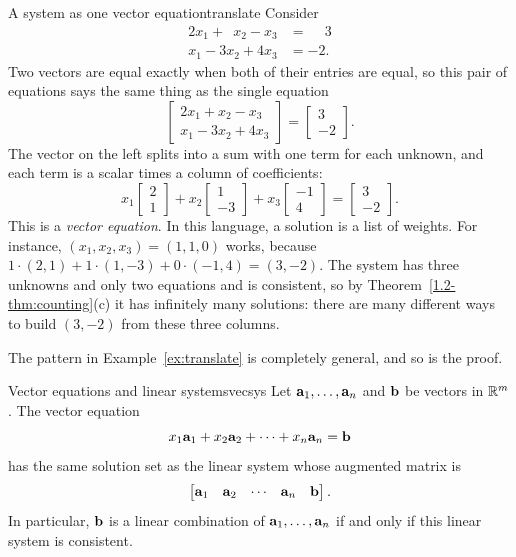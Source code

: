 \documentclass[11pt]{article}
\begin{document}
\begin{exmp}{A system as one vector equation}{translate}
Consider
\[
\begin{aligned}
2x_1+\phantom{3}x_2-x_3&=\phantom{-}3\\
x_1-3x_2+4x_3&=-2.
\end{aligned}
\]
Two vectors are equal exactly when both of their entries are equal, so this pair of equations says the same thing as the
single equation
\[
\begin{bmatrix}2x_1+x_2-x_3\\ x_1-3x_2+4x_3\end{bmatrix}=\begin{bmatrix}3\\-2\end{bmatrix}.
\]
The vector on the left splits into a sum with one term for each unknown, and each term is a scalar times a column of
coefficients:
\[
x_1\begin{bmatrix}2\\1\end{bmatrix}+x_2\begin{bmatrix}1\\-3\end{bmatrix}+x_3\begin{bmatrix}-1\\4\end{bmatrix}
=\begin{bmatrix}3\\-2\end{bmatrix}.
\]
This is a \emph{vector equation}. In this language, a solution is a list of weights. For instance,
$(x_1,x_2,x_3)=(1,1,0)$ works, because
$1\cdot(2,1)+1\cdot(1,-3)+0\cdot(-1,4)=(3,-2)$. The system has three unknowns and only two equations and is consistent,
so by Theorem~\ref{1.2-thm:counting}(c) it has infinitely many solutions: there are many different ways to build
$(3,-2)$ from these three columns.
\end{exmp}

The pattern in Example~\ref{ex:translate} is completely general, and so is the proof.

\begin{thm}{Vector equations and linear systems}{vecsys}
Let $\mathbf{a}_1,\dots,\mathbf{a}_n$ and $\mathbf{b}$ be vectors in $\mathbb{R}^m$. The vector equation
\[
x_1\mathbf{a}_1+x_2\mathbf{a}_2+\cdots+x_n\mathbf{a}_n=\mathbf{b}
\]
has the same solution set as the linear system whose augmented matrix is
\[
\begin{bmatrix}\mathbf{a}_1&\mathbf{a}_2&\cdots&\mathbf{a}_n&\mathbf{b}\end{bmatrix}.
\]
In particular, $\mathbf{b}$ is a linear combination of $\mathbf{a}_1,\dots,\mathbf{a}_n$ if and only if this linear system is consistent.
\end{thm}
\end{document}
